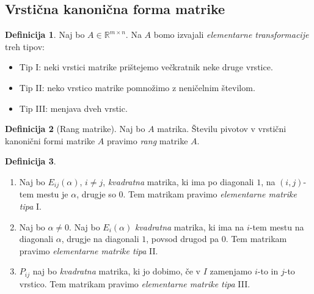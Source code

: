 \documentclass[11pt]{article}
\newcommand{\R}{\mathbb{R}}
\newcommand{\0}{\mathbf{0}}
\theoremstyle{definition}
\newtheorem{definicija}{Definicija}[section]
\theoremstyle{definition}
\theoremstyle{definition}
\theoremstyle{definition}
\begin{document}

\subsection{Vrstična kanonična forma matrike}
\vspace{0.5cm}

\begin{definicija}

Naj bo $A \in \R^{m \times n}$. Na $A$ bomo izvajali \textit{elementarne transformacije} treh tipov:
\begin{itemize}
\item Tip I: neki vrstici matrike prištejemo večkratnik neke druge vrstice.
\item Tip II: neko vrstico matrike pomnožimo z neničelnim številom.
\item Tip III: menjava dveh vrstic.
\end{itemize}

\end{definicija}
\vspace{0.5cm}

\begin{definicija}[Rang matrike]

Naj bo $A$ matrika. Številu pivotov v vrstični kanonični formi matrike $A$ pravimo \textit{rang} matrike $A$.

\end{definicija}
\vspace{0.5cm}

\begin{definicija}
~\\
\begin{enumerate}

\item Naj bo $E_{ij}(\alpha)$, $i \neq j$, \textit{kvadratna} matrika, ki ima po diagonali $1$, na $(i,j)$-tem mestu je $\alpha$, drugje so 0. Tem matrikam pravimo \textit{elementarne matrike tipa} I.

\item Naj bo $\alpha \neq 0$. Naj bo $E_i(\alpha)$ \textit{kvadratna} matrika, ki ima na $i$-tem mestu na diagonali $\alpha$, drugje na diagonali $1$, povsod drugod pa $0$. Tem matrikam pravimo \textit{elementarne matrike tipa} II.

\item $P_{ij}$ naj bo \textit{kvadratna} matrika, ki jo dobimo, če v $I$ zamenjamo $i$-to in $j$-to vrstico. Tem matrikam pravimo \textit{elementarne matrike tipa} III.

\end{enumerate}

\end{definicija}
\vspace{0.5cm}
\end{document}
